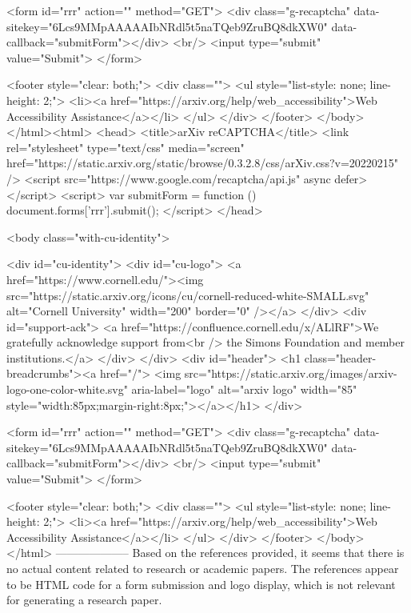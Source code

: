        <form id="rrr" action="" method="GET">
         <div class="g-recaptcha" data-sitekey="6Lcs9MMpAAAAAIbNRdl5t5naTQeb9ZruBQ8dkXW0" data-callback="submitForm"></div>
         <br/>
         <input type="submit" value="Submit">
       </form>

       <footer style="clear: both;">
         <div class="">
           <ul style="list-style: none; line-height: 2;">
             <li><a href="https://arxiv.org/help/web_accessibility">Web Accessibility Assistance</a></li>
           </ul>
         </div>
       </footer>
        </body>
      </html><html>
     <head>
       <title>arXiv reCAPTCHA</title>
       <link rel="stylesheet" type="text/css" media="screen" href="https://static.arxiv.org/static/browse/0.3.2.8/css/arXiv.css?v=20220215" />
       <script src="https://www.google.com/recaptcha/api.js" async defer></script>
       <script>
         var submitForm = function () {
             document.forms['rrr'].submit();
         }
       </script>
     </head>

     <body class="with-cu-identity">

       <div id="cu-identity">
         <div id="cu-logo">
           <a href="https://www.cornell.edu/"><img src="https://static.arxiv.org/icons/cu/cornell-reduced-white-SMALL.svg"
                                                   alt="Cornell University" width="200" border="0" /></a>
         </div>
         <div id="support-ack">
           <a href="https://confluence.cornell.edu/x/ALlRF">We gratefully acknowledge support from<br />
             the Simons Foundation and member institutions.</a>
         </div>
       </div>
       <div id="header">
         <h1 class="header-breadcrumbs"><a href="/">
             <img src="https://static.arxiv.org/images/arxiv-logo-one-color-white.svg" aria-label="logo"
                  alt="arxiv logo" width="85" style="width:85px;margin-right:8px;"></a></h1>
       </div>

       <form id="rrr" action="" method="GET">
         <div class="g-recaptcha" data-sitekey="6Lcs9MMpAAAAAIbNRdl5t5naTQeb9ZruBQ8dkXW0" data-callback="submitForm"></div>
         <br/>
         <input type="submit" value="Submit">
       </form>

       <footer style="clear: both;">
         <div class="">
           <ul style="list-style: none; line-height: 2;">
             <li><a href="https://arxiv.org/help/web_accessibility">Web Accessibility Assistance</a></li>
           </ul>
         </div>
       </footer>
        </body>
      </html>
        --------------------
         Based on the references provided, it seems that there is no actual content related to research or academic papers. The references appear to be HTML code for a form submission and logo display, which is not relevant for generating a research paper.

